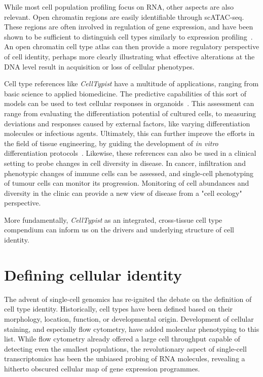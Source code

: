 While most cell population profiling focus on RNA, other aspects are also relevant. Open chromatin regions are easily identifiable through scATAC-seq. These regions are often involved in regulation of gene expression, and have been shown to be sufficient to distinguish cell types similarly to expression profiling~\citep{cusanovich_single-cell_2018}. An open chromatin cell type atlas can then provide a more regulatory perspective of cell identity, perhaps more clearly illustrating what effective alterations at the DNA level result in acquisition or loss of cellular phenotypes.

Cell type references like \textit{CellTypist} have a multitude of applications, ranging from basic science to applied biomedicine. The predictive capabilities of this sort of models can be used to test cellular responses in organoids~\citep{brazovskaja_high-throughput_2019}. This assessment can range from evaluating the differentiation potential of cultured cells, to measuring deviations and responses caused by external factors, like varying differentiation molecules or infectious agents. Ultimately, this can further improve the efforts in the field of tissue engineering, by guiding the development of \textit{in vitro} differentiation protocols~\citep{camp_single-cell_2018}. Likewise, these references can also be used in a clinical setting to probe changes in cell diversity in disease. In cancer, infiltration and phenotypic changes of immune cells can be assessed, and single-cell phenotyping of tumour cells can monitor its progression. Monitoring of cell abundances and diversity in the clinic can provide a new view of disease from a "cell ecology" perspective.

More fundamentally, \textit{CellTypist} as an integrated, cross-tissue cell type compendium can inform us on the drivers and underlying structure of cell identity.


\section{Defining cellular identity}
\label{section_ident}
The advent of single-cell genomics has re-ignited the debate on the definition of cell type identity. Historically, cell types have been defined based on their morphology, location, function, or developmental origin. Development of cellular staining, and especially flow cytometry, have added molecular phenotyping to this list. While flow cytometry already offered a large cell throughput capable of detecting even the smallest populations, the revolutionary aspect of single-cell transcriptomics has been the unbiased probing of RNA molecules, revealing a hitherto obscured cellular map of gene expression programmes.

